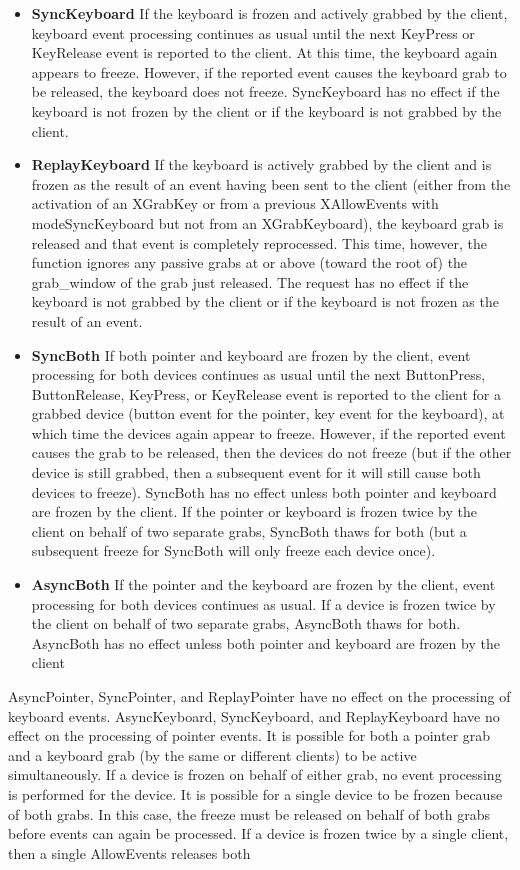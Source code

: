 \documentclass{report}
\begin{document}
\begin{itemize}
\begin{itemize}
                \item \textbf{SyncKeyboard} If the keyboard is frozen and actively grabbed by the client, keyboard event processing continues as usual until the next KeyPress or KeyRelease event is reported to the client. At this time, the keyboard again appears to freeze. However, if the reported event causes the keyboard grab to be released, the keyboard does not freeze. SyncKeyboard has no effect if the keyboard is not frozen by the client or if the keyboard is not grabbed by the client.
                \item \textbf{ReplayKeyboard} If the keyboard is actively grabbed by the client and is frozen as the result of an event having been sent to the client (either from the activation of an XGrabKey or from a previous XAllowEvents with modeSyncKeyboard but not from an XGrabKeyboard), the keyboard grab is released and that event is completely reprocessed. This time, however, the function ignores any passive grabs at or above (toward the root of) the grab\_window of the grab just released. The request has no effect if the keyboard is not grabbed by the client or if the keyboard is not frozen as the result of an event.
                \item \textbf{SyncBoth} If both pointer and keyboard are frozen by the client, event processing for both devices continues as usual until the next ButtonPress, ButtonRelease, KeyPress, or KeyRelease event is reported to the client for a grabbed device (button event for the pointer, key event for the keyboard), at which time the devices again appear to freeze. However, if the reported event causes the grab to be released, then the devices do not freeze (but if the other device is still grabbed, then a subsequent event for it will still cause both devices to freeze). SyncBoth has no effect unless both pointer and keyboard are frozen by the client. If the pointer or keyboard is frozen twice by the client on behalf of two separate grabs, SyncBoth thaws for both (but a subsequent freeze for SyncBoth will only freeze each device once).
                \item \textbf{AsyncBoth} If the pointer and the keyboard are frozen by the client, event processing for both devices continues as usual. If a device is frozen twice by the client on behalf of two separate grabs, AsyncBoth thaws for both. AsyncBoth has no effect unless both pointer and keyboard are frozen by the client
            \end{itemize}
            AsyncPointer, SyncPointer, and ReplayPointer have no effect on the processing of keyboard events. AsyncKeyboard, SyncKeyboard, and ReplayKeyboard have no effect on the processing of pointer events. It is possible for both a pointer grab and a keyboard grab (by the same or different clients) to be active simultaneously. If a device is frozen on behalf of either grab, no event processing is performed for the device. It is possible for a single device to be frozen because of both grabs. In this case, the freeze must be released on behalf of both grabs before events can again be processed. If a device is frozen twice by a single client, then a single AllowEvents releases both

\end{itemize}
\end{document}
